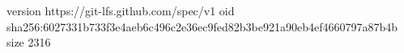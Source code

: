version https://git-lfs.github.com/spec/v1
oid sha256:6027331b733f3e4aeb6c496c2e36ec9fed82b3be921a90eb4ef4660797a87b4b
size 2316
